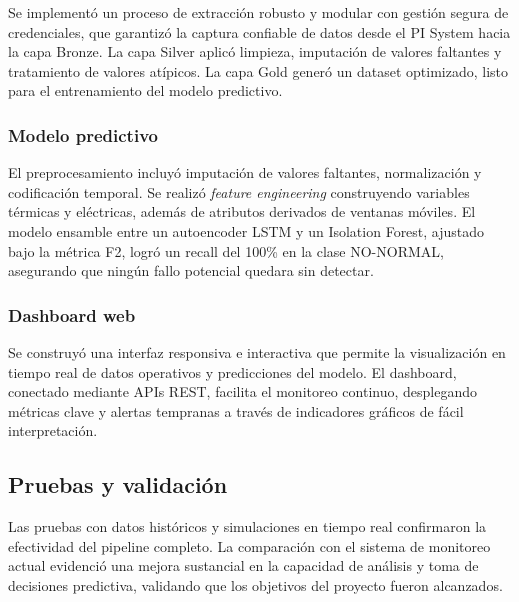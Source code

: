 \documentclass{univalle-perfil}
\begin{document}
Se implementó un proceso de extracción robusto y modular con gestión segura de
credenciales, que garantizó la captura confiable de datos desde el PI System hacia la
capa Bronze. La capa Silver aplicó limpieza, imputación de valores faltantes y
tratamiento de valores atípicos. La capa Gold generó un dataset optimizado, listo
para el entrenamiento del modelo predictivo.

\subsubsection{Modelo predictivo}

El preprocesamiento incluyó imputación de valores faltantes, normalización y
codificación temporal. Se realizó \textit{feature engineering} construyendo variables
térmicas y eléctricas, además de atributos derivados de ventanas móviles. El modelo
ensamble entre un autoencoder LSTM y un Isolation Forest, ajustado bajo la métrica
F2, logró un recall del 100\% en la clase NO-NORMAL, asegurando que ningún fallo
potencial quedara sin detectar.

\subsubsection{Dashboard web}

Se construyó una interfaz responsiva e interactiva que permite la visualización en
tiempo real de datos operativos y predicciones del modelo. El dashboard, conectado
mediante APIs REST, facilita el monitoreo continuo, desplegando métricas clave y
alertas tempranas a través de indicadores gráficos de fácil interpretación.

\subsection{Pruebas y validación}

Las pruebas con datos históricos y simulaciones en tiempo real confirmaron la
efectividad del pipeline completo. La comparación con el sistema de monitoreo
actual evidenció una mejora sustancial en la capacidad de análisis y toma de
decisiones predictiva, validando que los objetivos del proyecto fueron alcanzados.

\end{document}
